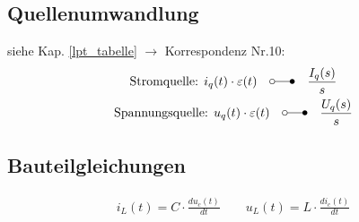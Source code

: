 \subsection{Quellenumwandlung}

siehe Kap. \ref{lpt_tabelle} $\rightarrow$ Korrespondenz Nr.10:
\begin{gather*}
	\text{Stromquelle: }i_q(t)\cdot \varepsilon(t) \quad \laplace \quad \frac{I_q(s)}{s}\\
	\text{Spannungsquelle: }u_q(t)\cdot \varepsilon(t) \quad \laplace \quad \frac{U_q(s)}{s}
\end{gather*}
\subsection{Bauteilgleichungen}
\begin{gather*}
	i_L (t) = C \cdot \frac{du_c(t)}{dt} \qquad u_L (t) = L \cdot \frac{di_c(t)}{dt}
\end{gather*}